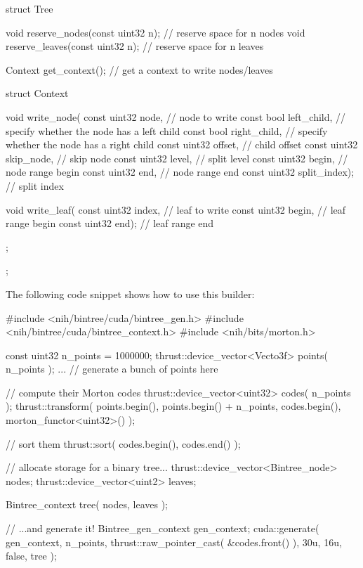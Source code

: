 \begin{DoxyCode}
 struct Tree
 {
    void reserve_nodes(const uint32 n);  // reserve space for n nodes
    void reserve_leaves(const uint32 n); // reserve space for n leaves

    Context get_context();             // get a context to write nodes/leaves

    struct Context
    {
        void write_node(
           const uint32 node,          // node to write
           const bool   left_child,    // specify whether the node has a left
       child
           const bool   right_child,   // specify whether the node has a right
       child
           const uint32 offset,        // child offset
           const uint32 skip_node,     // skip node
           const uint32 level,         // split level
           const uint32 begin,         // node range begin
           const uint32 end,           // node range end
           const uint32 split_index);  // split index

        void write_leaf(
           const uint32 index,         // leaf to write
           const uint32 begin,         // leaf range begin
           const uint32 end);          // leaf range end
    };
 };
\end{DoxyCode}


\-The following code snippet shows how to use this builder\-:


\begin{DoxyCode}
 #include <nih/bintree/cuda/bintree_gen.h>
 #include <nih/bintree/cuda/bintree_context.h>
 #include <nih/bits/morton.h>

 const uint32 n_points = 1000000;
 thrust::device_vector<Vecto3f> points( n_points );
 ... // generate a bunch of points here

 // compute their Morton codes
 thrust::device_vector<uint32> codes( n_points );
 thrust::transform(
     points.begin(),
     points.begin() + n_points,
     codes.begin(),
     morton_functor<uint32>() );

 // sort them
 thrust::sort( codes.begin(), codes.end() );

 // allocate storage for a binary tree...
 thrust::device_vector<Bintree_node> nodes;
 thrust::device_vector<uint2>        leaves;

 Bintree_context tree( nodes, leaves );

 // ...and generate it!
 Bintree_gen_context gen_context;
 cuda::generate(
     gen_context,
     n_points,
     thrust::raw_pointer_cast( &codes.front() ),
     30u,
     16u,
     false,
     tree );
\end{DoxyCode}
 
